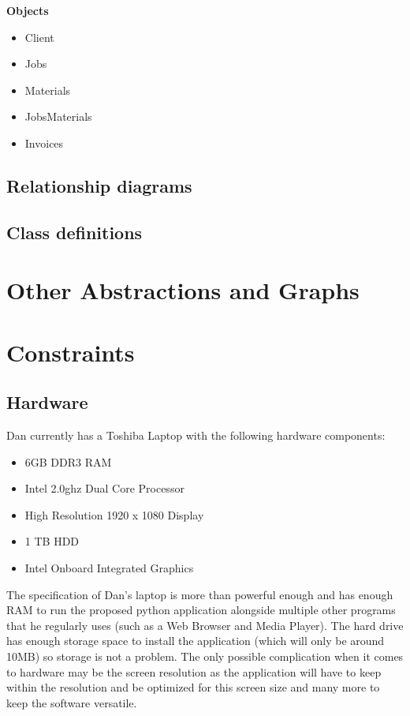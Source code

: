 \textbf{Objects}
	\begin{itemize}
		\item Client
		\item Jobs
		\item Materials
		\item JobsMaterials
		\item Invoices
	\end{itemize}

\subsection{Relationship diagrams}



\subsection{Class definitions}



\section{Other Abstractions and Graphs}

\section{Constraints}

\subsection{Hardware}

\begin{flushleft}
	Dan currently has a Toshiba Laptop with the following hardware components:
	
	\begin{itemize}
		\item 6GB DDR3 RAM
		\item Intel 2.0ghz Dual Core Processor
		\item High Resolution 1920 x 1080 Display
		\item 1 TB HDD
		\item Intel Onboard Integrated Graphics
	\end{itemize}

	The specification of Dan's laptop is more than powerful enough and has enough RAM to run the proposed python application alongside multiple other programs that he regularly uses (such as a Web Browser and Media Player). The hard drive has enough storage space to install the application (which will only be around 10MB) so storage is not a problem. The only possible complication when it comes to hardware may be the screen resolution as the application will have to keep within the resolution and be optimized for this screen size and many more to keep the software versatile.
\end{flushleft}

